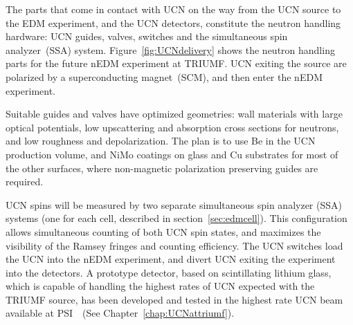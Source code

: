 The parts that come in contact with UCN on the way from the UCN source
to the EDM experiment, and the UCN detectors, constitute the neutron
handling hardware: UCN guides, valves, switches and the simultaneous
spin analyzer~(SSA) system. Figure~\ref{fig:UCNdelivery} shows the
neutron handling parts for the future nEDM experiment at TRIUMF.  UCN
exiting the source are polarized by a superconducting magnet~(SCM),
and then enter the nEDM experiment.

Suitable guides and valves have optimized geometries: wall materials
with large optical potentials, low upscattering and absorption cross
sections for neutrons, and low roughness and depolarization. The plan
is to use Be in the UCN production volume, and NiMo coatings on glass
and Cu substrates for most of the other surfaces, where non-magnetic
polarization preserving guides are required.

UCN spins will be measured by two separate simultaneous spin analyzer
(SSA) systems (one for each cell, described in
section~\ref{sec:edmcell}). This configuration allows simultaneous
counting of both UCN spin states, and maximizes the visibility of the
Ramsey fringes and counting efficiency.  The UCN switches load the UCN
into the nEDM experiment, and divert UCN exiting the experiment into
the detectors.  A prototype detector, based on scintillating lithium
glass, which is capable of handling the highest rates of UCN expected
with the TRIUMF source, has been developed and tested in the highest
rate UCN beam available at
PSI~\cite{jamieson2017characterization}~(See
Chapter~\ref{chap:UCNattriumf}).





